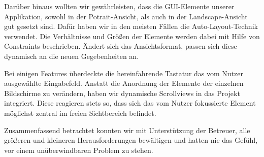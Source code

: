 	Darüber hinaus wollten wir gewährleisten, dass die GUI-Elemente unserer Applikation, sowohl in der Potrait-Ansicht, als auch in der Landscape-Ansicht gut gesetzt sind. Dafür haben wir in den meisten Fällen die Auto-Layout-Technik verwendet. Die Verhältnisse und Größen der Elemente werden dabei mit Hilfe von Constraints beschrieben. Ändert sich das Ansichtsformat, passen sich diese dynamisch an die neuen Gegebenheiten an.
	
	Bei einigen Features überdeckte die hereinfahrende Tastatur das vom Nutzer ausgewählte Eingabefeld. Anstatt die Anordnung der Elemente der einzelnen Bildschirme zu verändern, haben wir dynamische Scrollviews in das Projekt integriert. Diese reagieren stets so, dass sich das vom Nutzer fokussierte Element möglichst zentral im freien Sichtbereich befindet.

	Zusammenfassend betrachtet konnten wir mit Unterstützung der Betreuer, alle größeren und kleineren Herausforderungen bewältigen und hatten nie das Gefühl, vor einem unüberwindbaren Problem zu stehen.
	
	